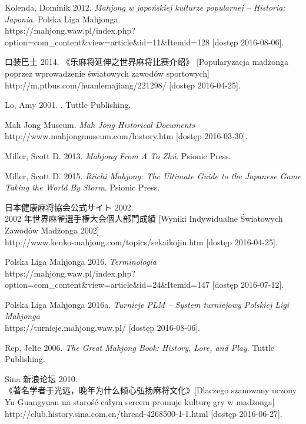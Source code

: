 Kolenda, Dominik 2012. \textit{Mahjong w japońskiej kulturze popularnej --
Historia: Japonia}. Polska Liga Mahjonga.
\\https://mahjong.waw.pl/index.php?option=com\_content\&view=article\&id=11\&Itemid=128
[dostęp 2016-08-06].

 口装巴士 2014.  《乐麻将延伸之世界麻将比赛介绍》
[Popularyzacja madżonga poprzez wprowadzenie światowych zawodów
sportowych] \\http://m.ptbus.com/huanlemajiang/221298/ [dostęp 2016-04-25].

Lo, Amy 2001. . Tuttle
Publishing.

Mah Jong Museum. \textit{Mah Jong Historical Documents}
\\http://www.mahjongmuseum.com/history.htm [dostęp
2016-03-30].


Miller, Scott D. 2013. \textit{Mahjong From A To Zhú}. Psionic Press.

Miller, Scott D. 2015. \textit{Riichi Mahjong: The Ultimate Guide to the
Japanese Game Taking the World By Storm}. Psionic Press.

 日本健康麻将協会公式サイト  2002.
\\ 2002
年世界麻雀選手権大会個人部門成績 [Wyniki Indywidualne Światowych Zawodów Madżonga 2002]
\\http://www.kenko-mahjong.com/topics/sekaikojin.htm [dostęp 2016-04-25].

Polska Liga Mahjonga 2016. \textit{Terminologia}
\\
https://mahjong.waw.pl/index.php?option=com\_content\&view=article\&id=24\&Itemid=147
[dostęp 2016-07-12].

Polska Liga Mahjonga 2016a. \textit{Turnieje PLM -- System turniejowy Polskiej
Ligi Mahjonga} \\https://turnieje.mahjong.waw.pl/ [dostęp 2016-08-06].

Rep, Jelte 2006. \textit{The Great Mahjong Book: History, Lore, and Play}.
Tuttle Publishing. %

Sina  新浪论坛 2010.  \\
《著名学者于光远，晚年为什么倾心弘扬麻将文化》[Dlaczego szanowany uczony Yu Guangyuan na
starość całym sercem promuje kulturę gry w madżonga]
\\http://club.history.sina.com.cn/thread-4268500-1-1.html [dostęp 2016-06-27].

